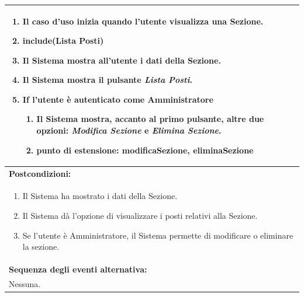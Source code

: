 \documentclass{article}
\begin{document}
\begin{table}[H]
\begin{tabular}{|p{\linewidth}|}
\begin{enumerate}
                            \item Il caso d'uso inizia quando l'utente visualizza una Sezione.
                            \item \textbf{include}(Lista Posti)
                            \item Il Sistema mostra all'utente i dati della Sezione.
                            \item Il Sistema mostra il pulsante \textit{Lista Posti}.
                            \item \textbf{If} l'utente è autenticato come Amministratore
                            \begin{enumerate}
                                \item Il Sistema mostra, accanto al primo pulsante, altre due opzioni: \textit{Modifica Sezione} e \textit{Elimina Sezione}.
                                \item[] \textbf{punto di estensione}: modificaSezione, eliminaSezione
                            \end{enumerate}
                        \end{enumerate} \\
                        \hline
                        \cellcolor{gray!20}
                        \textbf{Postcondizioni:} \\
                        \cellcolor{gray!20}
                        \begin{minipage}{\linewidth}
                            \begin{enumerate}
                                \item Il Sistema ha mostrato i dati della Sezione.
                                \item Il Sistema dà l'opzione di visualizzare i posti relativi alla Sezione.
                                \item Se l'utente è Amministratore, il Sistema permette di modificare o eliminare la sezione.
                            \end{enumerate}
                        \end{minipage} \\
                        \hline
                        \textbf{Sequenza degli eventi alternativa:} \\
                        Nessuna. \\
                        \hline
                    \end{tabular}
                \end{table}
                
\end{document}
